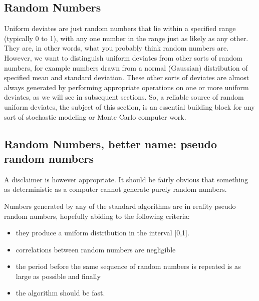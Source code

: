 \documentclass[letterpaper,10pt,english]{sphinxmanual}
\begin{document}
\subsection{Random Numbers}
\label{\detokenize{chapter2:random-numbers}}
Uniform deviates are just random numbers that lie within a specified range
(typically 0 to 1), with any one number in the range just as likely as any other. They
are, in other words, what you probably think random numbers are. However,
we want to distinguish uniform deviates from other sorts of random numbers, for
example numbers drawn from a normal (Gaussian) distribution of specified mean
and standard deviation. These other sorts of deviates are almost always generated by
performing appropriate operations on one or more uniform deviates, as we will see
in subsequent sections. So, a reliable source of random uniform deviates, the subject
of this section, is an essential building block for any sort of stochastic modeling
or Monte Carlo computer work.


\subsection{Random Numbers, better name: pseudo random numbers}
\label{\detokenize{chapter2:random-numbers-better-name-pseudo-random-numbers}}
A disclaimer is however appropriate. It should be fairly obvious that
something as deterministic as a computer cannot generate purely random numbers.

Numbers generated by any of the standard algorithms are in reality pseudo random
numbers, hopefully abiding to the following criteria:
\begin{itemize}
\item {} 
they produce a uniform distribution in the interval {[}0,1{]}.

\item {} 
correlations between random numbers are negligible

\item {} 
the period before the same sequence of random numbers is repeated   is as large as possible and finally

\item {} 
the algorithm should be fast.

\end{itemize}
\end{document}
